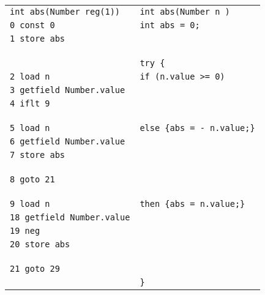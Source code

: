  
  \begin{figure}[ht!]
\begin{frameit}
  \scriptsize{
  \begin{tabular}{ll}
\lstinline!int abs(Number reg(1))!    & \lstinline!int abs(Number n )! \\
				     
\lstinline!0 const 0!                 &  \lstinline!int abs = 0;!\\
\lstinline!1 store abs!		      & \\ 
				      & \\ &\\ &\\
				      & \lstinline!try {!\\
\lstinline!2 load n!                  & \Myspace \lstinline!if (n.value >= 0)!\\
\lstinline!3 getfield Number.value! & \\
\lstinline!4 iflt 9!                  & \\
                                      & \\ &\\ &\\
\lstinline!5 load n!                  & \Myspace\Myspace\lstinline!else {abs = - n.value;}!\\			
\lstinline!6 getfield Number.value! & \\
\lstinline!7 store abs!                 & \\
                                      & \\ &\\ &\\
\lstinline!8 goto 21!		      & \\
                                      & \\ &\\ &\\
\lstinline!9 load n!		      & \Myspace\Myspace\lstinline!then {abs = n.value;}!\\
\lstinline!18 getfield Number.value!& \\
\lstinline!19 neg!                   & \\
\lstinline!20 store abs!		      & \\
                                      & \\ &\\ &\\
\lstinline!21 goto 29!		      & \\
                                      & \lstinline!}!\\

\end{tabular}}
\end{frameit}
\end{figure}
